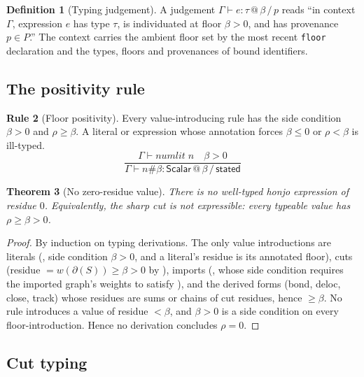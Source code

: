 \documentclass[11pt,twocolumn,a4paper]{article}
\theoremstyle{thmstyle}
\newtheorem{theorem}{Theorem}[section]
\theoremstyle{definition}
\newtheorem{definition}[theorem]{Definition}
\newtheorem{rulename}[theorem]{Rule}
\theoremstyle{remark}
\newcommand{\flo}{\beta}
\newcommand{\res}{\rho}
\newcommand{\cut}{\partial}
\newcommand{\hj}[1]{\texttt{#1}}
\newcommand{\stated}{\textsf{stated}}
\begin{document}
\begin{definition}[Typing judgement]
\label{def:judgement}
A judgement $\Gamma\vdash e : \tau \,@\, \flo \,/\, p$ reads ``in context
$\Gamma$, expression $e$ has type $\tau$, is individuated at floor
$\flo>0$, and has provenance $p\in P$.'' The context carries the ambient
floor set by the most recent \hj{floor} declaration and the types,
floors and provenances of bound identifiers.
\end{definition}

\subsection{The positivity rule}

\begin{rulename}[Floor positivity]
\label{rule:positive}
Every value-introducing rule has the side condition $\flo>0$ and
$\res\ge\flo$. A literal or expression whose annotation forces
$\flo\le0$ or $\res<\flo$ is ill-typed.
\[
\frac{\Gamma\vdash \textit{numlit}\;n \quad \flo>0}
     {\Gamma\vdash n\#\flo : \mathsf{Scalar}\,@\,\flo\,/\,\stated}
\]
\end{rulename}

\begin{theorem}[No zero-residue value]
\label{thm:no-zero-value}
There is no well-typed honjo expression of residue $0$. Equivalently, the
sharp cut is not expressible: every typeable value has $\res\ge\flo>0$.
\end{theorem}

\begin{proof}
By induction on typing derivations. The only value introductions are
literals (, side condition $\flo>0$, and a literal's
residue is its annotated floor), cuts (residue $=w(\cut(S))\ge\flo>0$ by
), imports (, whose side
condition requires the imported graph's weights to satisfy
), and the derived forms (bond, deloc, close, track)
whose residues are sums or chains of cut residues, hence $\ge\flo$. No
rule introduces a value of residue $<\flo$, and $\flo>0$ is a side
condition on every floor-introduction. Hence no derivation concludes
$\res=0$.
\end{proof}

\subsection{Cut typing}
\end{document}
